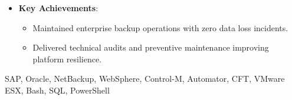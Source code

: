 \begin{experiences}
{\begin{itemize}[left=0pt,label={},itemsep=0.5em]
          \item \textbf{Key Achievements}:
            \begin{itemize}[itemsep=0.2em,topsep=0.2em,parsep=0pt]
              \small
              \item Maintained enterprise backup operations with zero data loss incidents.
              \item Delivered technical audits and preventive maintenance improving platform resilience.
            \end{itemize}
        \end{itemize}
        \vspace{0.5em}  %
    }
    {SAP, Oracle, NetBackup, WebSphere, Control-M, Automator, CFT, VMware ESX, Bash, SQL, PowerShell}

\emptySeparator
\end{experiences}
